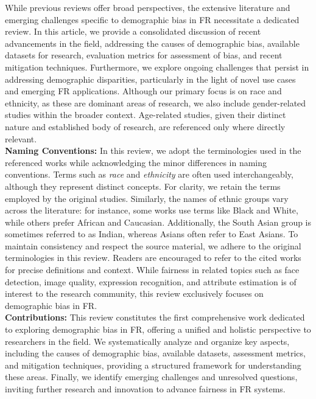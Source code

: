 While previous reviews offer broad perspectives, the extensive literature and
emerging challenges specific to demographic bias in FR necessitate a dedicated
review. In this article, we provide a consolidated discussion of recent
advancements in the field, addressing the causes of demographic bias, available
datasets for research, evaluation metrics for assessment of bias, and recent
mitigation techniques. Furthermore, we explore ongoing challenges that persist
in addressing demographic disparities, particularly in the light of novel use
cases and emerging FR applications. Although our primary focus is on race and
ethnicity, as these are dominant areas of research, we also include
gender-related studies within the broader context. Age-related studies, given
their distinct nature and established body of research, are referenced only
where directly relevant.\\

\noindent\textbf{Naming Conventions:} In this review, we adopt the terminologies
used in the referenced works while acknowledging the minor differences in naming
conventions. Terms such as \textit{race} and \textit{ethnicity} are often used
interchangeably, although they represent distinct concepts. For clarity, we
retain the terms employed by the original studies. Similarly, the names of
ethnic groups vary across the literature: for instance, some works use terms
like Black and White, while others prefer African and Caucasian. Additionally,
the South Asian group is sometimes referred to as Indian, whereas Asians often
refer to East Asians. To maintain consistency and respect the source material,
we adhere to the original terminologies in this review. Readers are encouraged
to refer to the cited works for precise definitions and context. While fairness
in related topics such as face detection, image quality, expression recognition,
and attribute estimation is of interest to the research community, this review
exclusively focuses on demographic bias in FR.\\

\noindent\textbf{Contributions:} This review constitutes the first comprehensive
work dedicated to exploring demographic bias in FR, offering a unified and
holistic perspective to researchers in the field. We systematically analyze and
organize key aspects, including the causes of demographic bias, available
datasets, assessment metrics, and mitigation techniques, providing a structured
framework for understanding these areas. Finally, we identify emerging
challenges and unresolved questions, inviting further research and innovation to
advance fairness in FR systems.

